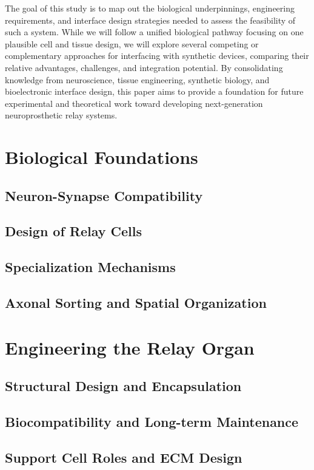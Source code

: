 \documentclass[12pt]{article}
\begin{document}
	The goal of this study is to map out the biological underpinnings, engineering requirements, and interface design strategies needed to assess the feasibility of such a system. While we will follow a unified biological pathway focusing on one plausible cell and tissue design, we will explore several competing or complementary approaches for interfacing with synthetic devices, comparing their relative advantages, challenges, and integration potential. By consolidating knowledge from neuroscience, tissue engineering, synthetic biology, and bioelectronic interface design, this paper aims to provide a foundation for future experimental and theoretical work toward developing next-generation neuroprosthetic relay systems.
	
	
	\section{Biological Foundations}
	\subsection{Neuron-Synapse Compatibility}
	\subsection{Design of Relay Cells}
	\subsection{Specialization Mechanisms}
	\subsection{Axonal Sorting and Spatial Organization}
	
	\section{Engineering the Relay Organ}
	\subsection{Structural Design and Encapsulation}
	\subsection{Biocompatibility and Long-term Maintenance}
	\subsection{Support Cell Roles and ECM Design}
	
\end{document}
